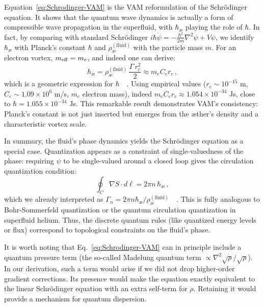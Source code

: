 \documentclass[a4paper,12pt]{article}
\begin{document}
    Equation~\eqref{eq:Schrodinger-VAM} is the VAM reformulation of the Schrödinger equation. It shows that the quantum wave dynamics is actually a form of compressible wave propagation in the superfluid, with $\hbar_{\text{\ae}}$ playing the role of $\hbar$. In fact, by comparing with standard Schrödinger $i\hbar \dot{\psi} = -\frac{\hbar^2}{2m}\nabla^2\psi + V \psi$, we identify $\hbar_{\text{\ae}}$ with Planck’s constant $\hbar$ and $\rho_{\text{\ae}}^{(\text{fluid})}$ with the particle mass $m$. For an electron vortex, $m_{\rm eff} = m_e$, and indeed one can derive:
    \begin{equation}
        \hbar_{\text{\ae}} = \rho_{\text{\ae}}^{(\text{fluid})}\,\frac{\Gamma\, r_c^2}{2} \approx m_e C_e r_c\,,
        \label{eq:hbar-geom}
    \end{equation}
    which is a geometric expression for $\hbar$~\cite{reference_72}~\cite{reference_73}. Using empirical values ($r_c \sim 10^{-15}$ m, $C_e \sim 1.09\times 10^6$ m/s, $m_e$ electron mass), indeed $m_e C_e r_c \approx 1.054\times 10^{-34}$ Js, close to $\hbar = 1.055\times 10^{-34}$ Js. This remarkable result demonstrates VAM’s consistency: Planck’s constant is not just inserted but emerges from the æther’s density and a characteristic vortex scale.

    In summary, the fluid’s phase dynamics yields the Schrödinger equation as a special case. Quantization appears as a constraint of single-valuedness of the phase: requiring $\psi$ to be single-valued around a closed loop gives the circulation quantization condition:
    \begin{equation}
        \oint_C \nabla S \cdot d\ell = 2\pi n\,\hbar_{\text{\ae}}\,,
    \end{equation}
    which we already interpreted as $\Gamma_n = 2\pi n \hbar_{\text{\ae}}/\rho_{\text{\ae}}^{(\text{fluid})}$~\cite{reference_74}~\cite{reference_75}. This is fully analogous to Bohr-Sommerfeld quantization or the quantum circulation quantization in superfluid helium. Thus, the discrete quantum rules (like quantized energy levels or flux) correspond to topological constraints on the fluid’s phase.

    It is worth noting that Eq.~\eqref{eq:Schrodinger-VAM} can in principle include a quantum pressure term (the so-called Madelung quantum term $\propto \nabla^2\sqrt{\rho}/\sqrt{\rho}$). In our derivation, such a term would arise if we did not drop higher-order gradient corrections. Its presence would make the equation exactly equivalent to the linear Schrödinger equation with an extra self-term for $\rho$. Retaining it would provide a mechanism for quantum dispersion.
\end{document}
